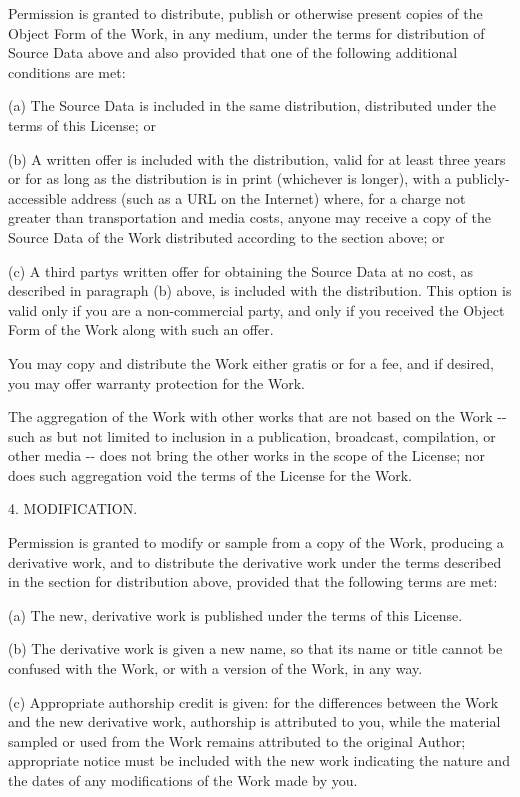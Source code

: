\documentclass[
  english,
  11pt,
  a4paper,
]{article}
\begin{document}
Permission is granted to distribute, publish or otherwise present copies
of the Object Form of the Work, in any medium, under the terms for
distribution of Source Data above and also provided that one of the
following additional conditions are met:

(a) The Source Data is included in the same distribution, distributed
under the terms of this License; or

(b) A written offer is included with the distribution, valid for at
least three years or for as long as the distribution is in print
(whichever is longer), with a publicly-accessible address (such as a URL
on the Internet) where, for a charge not greater than transportation and
media costs, anyone may receive a copy of the Source Data of the Work
distributed according to the section above; or

(c) A third party\textquotesingle s written offer for obtaining the
Source Data at no cost, as described in paragraph (b) above, is included
with the distribution. This option is valid only if you are a
non-commercial party, and only if you received the Object Form of the
Work along with such an offer.

You may copy and distribute the Work either gratis or for a fee, and if
desired, you may offer warranty protection for the Work.

The aggregation of the Work with other works that are not based on the
Work -\/- such as but not limited to inclusion in a publication,
broadcast, compilation, or other media -\/- does not bring the other
works in the scope of the License; nor does such aggregation void the
terms of the License for the Work.

4. MODIFICATION.

Permission is granted to modify or sample from a copy of the Work,
producing a derivative work, and to distribute the derivative work under
the terms described in the section for distribution above, provided that
the following terms are met:

(a) The new, derivative work is published under the terms of this
License.

(b) The derivative work is given a new name, so that its name or title
cannot be confused with the Work, or with a version of the Work, in any
way.

(c) Appropriate authorship credit is given: for the differences between
the Work and the new derivative work, authorship is attributed to you,
while the material sampled or used from the Work remains attributed to
the original Author; appropriate notice must be included with the new
work indicating the nature and the dates of any modifications of the
Work made by you.
\end{document}
